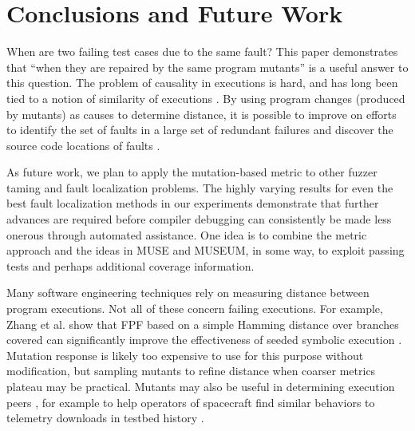 \section{Conclusions and Future Work}
\label{conc}

When are two failing test cases due to the same fault?  This paper
demonstrates that
``when they are repaired by the same program mutants'' is a useful answer to
this question.  The problem of causality in executions is hard, and
has long been tied to a notion of similarity of
executions \cite{NearNeighbor,GroceError}.  By using program changes
(produced by mutants) as
causes to determine distance, it is possible to improve on efforts
to identify the set of faults in a large set of redundant failures
\cite{PLDI13} and discover the source code locations of faults
\cite{MUSE,multilingual}.

As future work, we plan to apply the mutation-based metric to other
fuzzer taming and fault localization problems.  The highly varying
results for even the best fault localization methods in our
experiments demonstrate that further advances are required before
compiler debugging can consistently be made less onerous through automated
assistance.  One idea is to combine the metric approach and the ideas
in MUSE and MUSEUM, in some way, to exploit passing tests and perhaps
additional coverage information.

Many software engineering techniques rely on measuring distance
between program executions.  Not all of these concern failing
executions.  For example, Zhang et al. \cite{issta14} show that FPF based on a simple
Hamming distance over branches covered can significantly improve the
effectiveness of seeded symbolic execution
\cite{Zesti,PersonSeed,BugRedux}.  Mutation response is likely too
expensive to use for this purpose without modification, but sampling
mutants to refine distance when coarser metrics plateau
may be practical.  Mutants may also be useful in determining
execution peers \cite{Sumner2011}, for example to help operators of
spacecraft find similar behaviors to telemetry downloads in testbed
history \cite{KlausRajeev,scriptstospecs}.